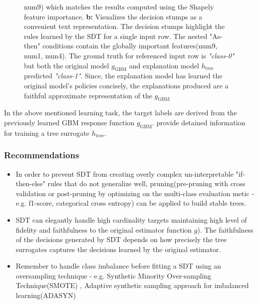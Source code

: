 \documentclass{article}
\begin{document}
\begin{figure}[H]
{	num9) which matches the results computed using the Shapely feature importance. \textbf{b:} Visualizes the decision stumps as a convenient text representation. The decision stumps highlight the rules learned by the SDT for a single input row. The nested 
	"As-then" conditions contain the globally important features(num9, num1, num4). The ground truth for referenced input row is \textit{"class-0"} but both the original model $g_{\text{GBM}}$ and explanation model $h_{\text{tree}}$ predicted \textit{"class-1"}.
	Since, the explanation model has learned the original model's policies concisely, the explanations produced are a faithful approximate representation of the $g_{\text{GBM}}$}
\end{figure}

In the above mentioned learning task, the target labels are derived from the previously learned GBM response function $g_{\text{GBM}}$. \cite{dt_surrogate1} \cite{dt_surrogate2} provide detained information for training a tree surrogate $h_{\text{tree}}$. 
\subsubsection{Recommendations}
\begin{itemize}
\item In order to prevent SDT from creating overly complex un-interpretable "if-then-else" rules that do not generalize well, pruning(pre-pruning with cross validation or post-pruning by optimizing on the multi-class evaluation metic - e.g. f1-score, categorical cross entropy) can be applied to build stable trees.
\item SDT can elegantly handle high cardinality targets maintaining high level of fidelity and faithfulness to the original  estimator function $g$). The faithfulness of the decisions generated by SDT depends on how precisely the tree surrogates captures the decisions learned by the original estimator.
\item Remember to handle class imbalance before fitting a SDT using an oversampling technique - e.g. Synthetic Minority Over-sampling Technique(SMOTE) \cite{chawla2002smote}, Adaptive synthetic sampling approach for imbalanced learning(ADASYN)\cite{he2008adasyn}
\end{itemize}
\end{document}
